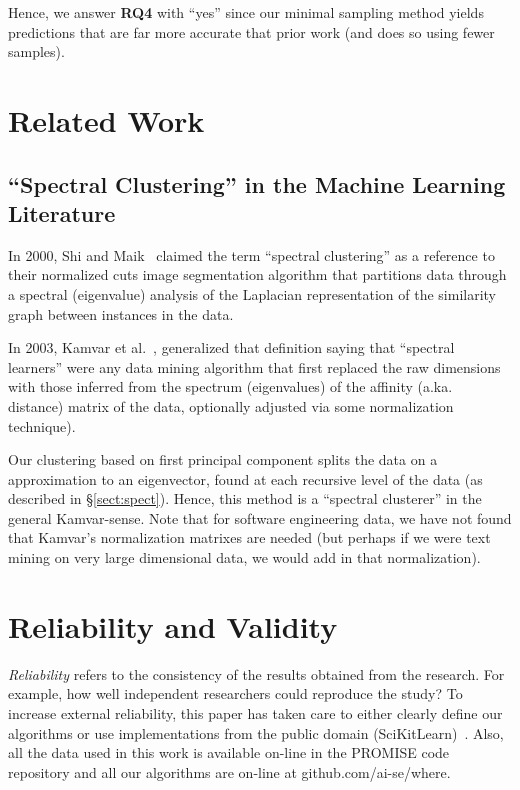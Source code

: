 \documentclass{sig-alternative}
\newcommand{\tion}[1]{\S\ref{sect:#1}}
\begin{document}
\begin{myshadowbox}
Hence, we answer {\bf RQ4} with ``yes''
since our minimal sampling method yields predictions that are far more accurate that prior
work (and does so using fewer samples).
\end{myshadowbox}


 \section{Related Work}
 \subsection{``Spectral Clustering'' in the  Machine Learning Literature}\label{sect:related}
 
In 2000, Shi and Maik~\cite{shi00} claimed the term ``spectral clustering'' as a reference to their normalized cuts
image
segmentation algorithm that  partitions data through a spectral (eigenvalue) analysis of the  
Laplacian representation of the similarity graph between instances in the data.

In 2003, Kamvar et al.~\cite{kamvar2003spectral},  generalized that definition saying that ``spectral learners''
were any data mining algorithm that first replaced the raw
dimensions with those inferred from the spectrum (eigenvalues) of the affinity (a.ka. distance)
matrix of the data, optionally adjusted via some normalization technique).

Our clustering based on first principal component splits the data on a   approximation to an eigenvector, found at each recursive level
of the data (as described in \tion{spect}). 
Hence, this  method is a ``spectral clusterer'' in the general Kamvar-sense. 
Note that
for software engineering data, we have
not found that Kamvar's normalization matrixes are needed (but perhaps if we were text mining
on very large dimensional data, we would add in that normalization). 
 


\section{Reliability and Validity}\label{sect:construct}

{\em Reliability} refers to the consistency of the results obtained
from the research.  For example,   how well independent researchers
could reproduce the study? To increase external
reliability, this paper has taken care to either  clearly define our
algorithms or use implementations from the public domain
(SciKitLearn)~\cite{scikit-learn}. Also, all the data used in this work is available
on-line in the PROMISE code repository and all our algorithms
are on-line at github.com/ai-se/where.
\end{document}

